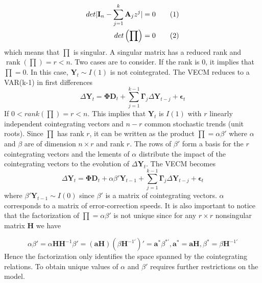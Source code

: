 \documentclass[11pt,a4,twosided,singlespacing,titlepagenumber=on]{scrreprt}
\numberwithin{equation}{chapter} %
\theoremstyle{remark}
\DeclareMathOperator{\rank}{rank}
\newcommand{\matr}[1]{\mathbf{#1}}
\newcommand\numberthis{\addtocounter{equation}{1}\tag{\theequation}}
\begin{document}
\begin{align*}
det |\matr{I}_n - \sum_{j=1}^k \matr{A}_j z^j| = 0 \numberthis \\
det \left(\prod \right) = 0 \numberthis
\end{align*}
which means that $\prod$ is singular. A singular matrix has a reduced rank and $\rank(\prod) = r < n$. Two cases are to consider. If the rank is 0, it implies that $\prod = 0$. In this case, $\matr{Y}_t \sim I(1)$ is not cointegrated. The VECM reduces to a VAR(k-1) in first differences
\begin{equation}
\Delta \matr{Y}_t = \matr{\Phi} \matr{D}_t + \sum_{j=1}^{k-1} \matr{\Gamma}_j \Delta \matr{Y}_{t-j} + \matr{\epsilon}_t
\end{equation}
If $0 < rank(\prod) = r < n$. This implies that $\matr{Y}_t$ is $I(1)$ with $r$ linearly independent cointegrating vectors and $n-r$ common stochastic trends (unit roots). Since $\prod$ has rank $r$, it can be written as the product $\prod = \alpha \beta'$ where $\alpha$ and $\beta$ are of dimension $n \times r$ and rank $r$.  The rows of $\beta'$ form a basis for the $r$ cointegrating vectors and the lements of $\alpha$ distribute the impact of the cointegrating vectors to the evolution of $\Delta \matr{Y}_t$. The VECM becomes
\begin{equation}
\Delta \matr{Y}_t = \matr{\Phi} \matr{D}_t + \alpha \beta' \matr{Y}_{t-1} + \sum_{j=1}^{k-1} \matr{\Gamma}_j \Delta \matr{Y}_{t-j} + \matr{\epsilon}_t
\end{equation}
where $\beta' \matr{Y}_{t-1} \sim I(0)$ since $\beta'$ is a matrix of cointegrating vectors. $\alpha$ corresponds to a matrix of error-correction speeds. It is also important to notice that the factorization of $\prod = \alpha \beta'$ is not unique since for any $r \times r$ nonsingular matrix $\matr{H}$ we have

\begin{equation}
\alpha \beta' = \alpha \matr{H} \matr{H}^{-1} \beta' = (\matr{a}\matr{H})(\beta \matr{H}^{-1'})' = \matr{a}^* \beta^{*'}, \matr{a}^* = \matr{a}\matr{H}, \beta^* = \beta \matr{H}^{-1'}
\end{equation}
Hence the factorization only identifies the space spanned by the cointegrating relations. To obtain unique values of $\alpha$ and $\beta'$ requires further restrictions on the model. \\
\end{document}
